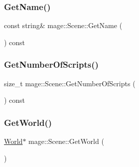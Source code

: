 \hypertarget{classmage_1_1_scene_a251ff8f6ce0da5c55ee31e3450b5fb9a}{}\label{classmage_1_1_scene_a251ff8f6ce0da5c55ee31e3450b5fb9a} 
\subsubsection{\texorpdfstring{Get\+Name()}{GetName()}}
{\footnotesize\ttfamily const string\& mage\+::\+Scene\+::\+Get\+Name (\begin{DoxyParamCaption}{ }\end{DoxyParamCaption}) const}

\hypertarget{classmage_1_1_scene_a799ac8ddd90d24f6c3c208942e4f159c}{}\label{classmage_1_1_scene_a799ac8ddd90d24f6c3c208942e4f159c} 
\subsubsection{\texorpdfstring{Get\+Number\+Of\+Scripts()}{GetNumberOfScripts()}}
{\footnotesize\ttfamily size\+\_\+t mage\+::\+Scene\+::\+Get\+Number\+Of\+Scripts (\begin{DoxyParamCaption}{ }\end{DoxyParamCaption}) const}

\hypertarget{classmage_1_1_scene_abade558e953a062b5040f48d8e7371f4}{}\label{classmage_1_1_scene_abade558e953a062b5040f48d8e7371f4} 
\subsubsection{\texorpdfstring{Get\+World()}{GetWorld()}\hspace{0.1cm}{\footnotesize\ttfamily [1/2]}}
{\footnotesize\ttfamily \hyperlink{classmage_1_1_world}{World}$\ast$ mage\+::\+Scene\+::\+Get\+World (\begin{DoxyParamCaption}{ }\end{DoxyParamCaption})}

\hypertarget{classmage_1_1_scene_a0438504884c566e0d6264436b78ee764}{}\label{classmage_1_1_scene_a0438504884c566e0d6264436b78ee764} 
